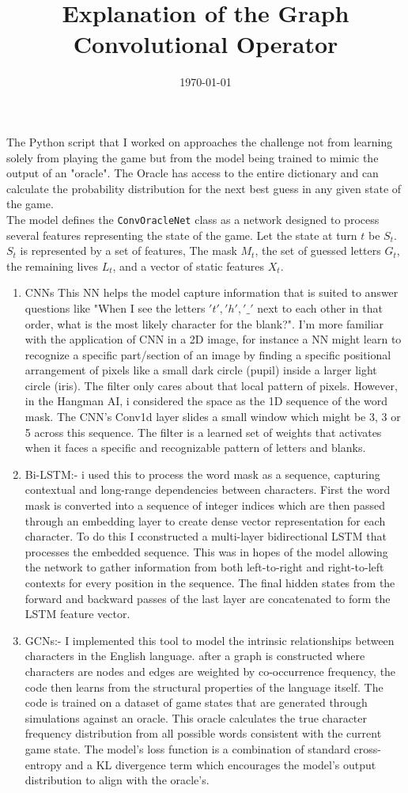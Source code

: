 \documentclass{article}
\title{Explanation of the Graph Convolutional Operator} \author{}
\date{\today}
\begin{document}
 

 
The Python script that I worked on approaches the challenge not from learning solely from playing the game but from the model being trained to mimic the output of an "oracle". The Oracle has access to the entire dictionary and can calculate the probability distribution for the next best guess in any given state of the game. \\


The model defines the \texttt{ConvOracleNet} class as a network designed to process several features representing the state of the game. Let the state at turn $t$ be $S_t$. $S_t$ is represented by a set of features, The mask $M_t$, the set of guessed letters $G_t$, the remaining lives $L_t$, and a vector of static features $X_t$.


\begin{enumerate}
    \item CNNs  This NN helps the model capture information that is suited to answer questions like "When I see the letters $'t', 'h', '\_'$ next to each other in that order, what is the most likely character for the blank?". I'm more familiar with the application of CNN in a 2D image, for instance a NN might learn to recognize a specific part/section of an image by finding a specific positional arrangement of pixels like a small dark circle (pupil) inside a larger light circle (iris). The filter only cares about that local pattern of pixels. However, in the Hangman AI, i considered the space as the 1D sequence of the word mask. The CNN's Conv1d layer slides a small window which might be 3, 3 or 5 across this sequence. The filter is a learned set of weights that activates when it faces a specific and recognizable pattern of letters and blanks.
     \item Bi-LSTM:- i used this to process the word mask
    as a sequence, capturing contextual and long-range dependencies between characters.
    First the word mask is converted into a sequence of integer indices which are then passed through an embedding layer to create dense vector representation for each character.
    To do this I cconstructed a multi-layer bidirectional LSTM that processes the embedded sequence. This was in hopes of the model allowing the network to gather information from both left-to-right and right-to-left contexts for every position in the sequence. The final hidden states from the forward and backward passes of the last layer are concatenated to form the LSTM feature vector.
    \item GCNs:- I implemented this tool to model the intrinsic relationships between characters in the English language. after a graph is constructed where characters are nodes and edges are weighted by co-occurrence frequency, the code then learns from the structural properties of the language itself.
    The code is trained on a dataset of game states that are generated through simulations against an oracle. This oracle calculates the true character frequency distribution from all possible words consistent with the current game state. The model's loss function is a combination of standard cross-entropy and a KL divergence term which encourages the model's output distribution to align with the oracle's. 
    
\end{enumerate}
\end{document}
